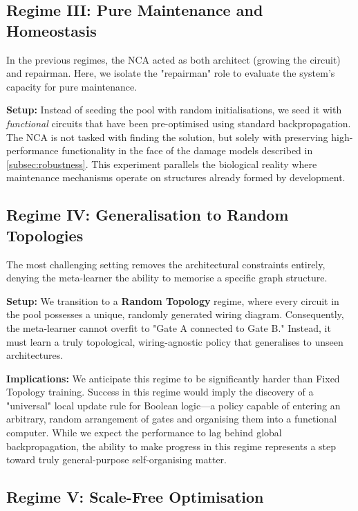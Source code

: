\subsection{Regime III: Pure Maintenance and Homeostasis}
\label{subsec:maintenance}

In the previous regimes, the NCA acted as both architect (growing the circuit) and repairman. Here, we isolate the "repairman" role to evaluate the system's capacity for pure maintenance.

\textbf{Setup:}
Instead of seeding the pool with random initialisations, we seed it with \textit{functional} circuits that have been pre-optimised using standard backpropagation. The NCA is not tasked with finding the solution, but solely with preserving high-performance functionality in the face of the damage models described in \cref{subsec:robustness}. This experiment parallels the biological reality where maintenance mechanisms operate on structures already formed by development.

\subsection{Regime IV: Generalisation to Random Topologies}
\label{subsec:random_wiring}

The most challenging setting removes the architectural constraints entirely, denying the meta-learner the ability to memorise a specific graph structure.

\textbf{Setup:}
We transition to a \textbf{Random Topology} regime, where every circuit in the pool possesses a unique, randomly generated wiring diagram.
Consequently, the meta-learner cannot overfit to "Gate A connected to Gate B." Instead, it must learn a truly topological, wiring-agnostic policy that generalises to unseen architectures.

\textbf{Implications:}
We anticipate this regime to be significantly harder than Fixed Topology training. Success in this regime would imply the discovery of a "universal" local update rule for Boolean logic—a policy capable of entering an arbitrary, random arrangement of gates and organising them into a functional computer. While we expect the performance to lag behind global backpropagation, the ability to make progress in this regime represents a step toward truly general-purpose self-organising matter.

\subsection{Regime V: Scale-Free Optimisation}
\label{subsec:scalability}

